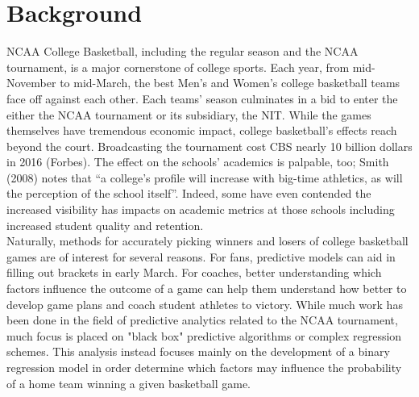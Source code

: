 \documentclass[12pt]{article}\usepackage[]{graphicx}\usepackage[]{color}
\begin{document}
\doublespacing

\section{Background}
NCAA College Basketball, including the regular season and the NCAA tournament, is a major cornerstone of college sports. Each year, from mid-November to mid-March, the best Men’s and Women’s college basketball teams face off against each other. Each teams’ season culminates in a bid to enter the either the NCAA tournament or its subsidiary, the NIT. While the games themselves have tremendous economic impact, college basketball's effects reach beyond the court. Broadcasting the tournament cost CBS nearly 10 billion dollars in 2016 (Forbes). The effect on the schools’ academics is palpable, too; Smith (2008) notes that “a college’s profile will increase with big-time athletics, as will the perception of the school itself”. Indeed, some have even contended the increased visibility has impacts on academic metrics at those schools including increased student quality and retention.\\

Naturally, methods for accurately picking winners and losers of college basketball games are of interest for several reasons. For fans, predictive models can aid in filling out brackets in early March. For coaches, better understanding which factors influence the outcome of a game can help them understand how better to develop game plans and coach student athletes to victory. While much work has been done in the field of predictive analytics related to the NCAA tournament, much focus is placed on "black box" predictive algorithms or complex regression schemes. This analysis instead focuses mainly on the development of a binary regression model in order determine which factors may influence the probability of a home team winning a given basketball game.\\
\end{document}

